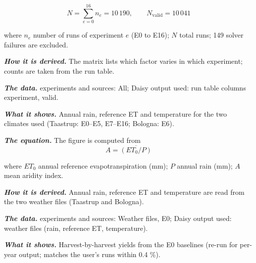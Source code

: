 \begin{equation}\boxed{N=\sum_{e=0}^{16} n_e=10\,190,\qquad N_{\mathrm{valid}}=10\,041}\end{equation}
\par\noindent where $n_e$ number of runs of experiment $e$ (E0 to E16); $N$ total runs; 149 solver failures are excluded.
\par\noindent\textbf{\color{khmag}\emph{How it is derived.}} The matrix lists which factor varies in which experiment; counts are taken from the run table.
\par\noindent\textbf{\color{khmag}\emph{The data.}} experiments and sources: All; Daisy output used: run table columns experiment, valid.
\par\vspace{6pt}\noindent{}\par\nobreak
{}\label{fig:a19_3}
\par\noindent\textbf{\color{khmag}\emph{What it shows.}} Annual rain, reference ET and temperature for the two climates used (Taastrup: E0--E5, E7--E16; Bologna: E6).
\par\noindent\textbf{\color{khmag}\emph{The equation.}} The figure is computed from
\begin{equation}\boxed{A=\overline{\left(ET_0/P\right)}}\end{equation}
\par\noindent where $ET_0$ annual reference evapotranspiration (mm); $P$ annual rain (mm); $A$ mean aridity index.
\par\noindent\textbf{\color{khmag}\emph{How it is derived.}} Annual rain, reference ET and temperature are read from the two weather files (Taastrup and Bologna).
\par\noindent\textbf{\color{khmag}\emph{The data.}} experiments and sources: Weather files, E0; Daisy output used: weather files (rain, reference ET, temperature).
\par\vspace{6pt}\noindent{}\par\nobreak
{}\label{fig:a19_4}
\par\noindent\textbf{\color{khmag}\emph{What it shows.}} Harvest-by-harvest yields from the E0 baselines (re-run for per-year output; matches the user's runs within 0.4 \%).
